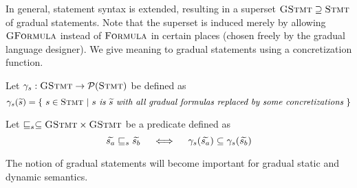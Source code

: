 In general, statement syntax is extended, resulting in a superset $\textsc{GStmt} \supseteq \textsc{Stmt}$ of gradual statements.
Note that the superset is induced merely by allowing $\textsc{GFormula}$ instead of $\textsc{Formula}$ in certain places (chosen freely by the gradual language designer).
We give meaning to gradual statements using a concretization function. %
\begin{definition}
    Let $\gamma_s : \textsc{GStmt} \rightarrow \mathcal{P}(\textsc{Stmt})$ be defined as
    \begin{displaymath}
    \gamma_s(\widetilde{s}) = \{~ s \in \textsc{Stmt} ~|~ \textit{$s$ is $\widetilde{s}$ with all gradual formulas replaced by some concretizations} ~\}
    \end{displaymath}
\end{definition}
\begin{definition}
    Let $\sqsubseteq_s \subseteq \textsc{GStmt} \times \textsc{GStmt}$ be a predicate defined as
    $$\widetilde{s_a} \sqsubseteq_s \widetilde{s_b}  \quad\iff\quad  \gamma_s(\widetilde{s_a}) \subseteq \gamma_s(\widetilde{s_b})$$
\end{definition}

The notion of gradual statements will become important for gradual static and dynamic semantics.
